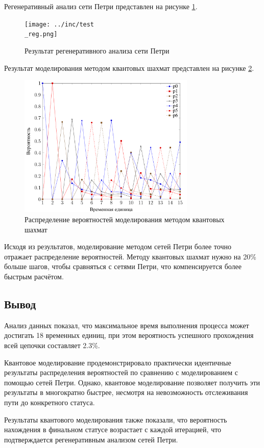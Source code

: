 \clearpage

Регенеративный анализ сети Петри представлен на рисунке \ref{fig:testreg}.

\begin{figure}[h!btp]
	\centering
	\texttt{[image: ../inc/test\\\_reg.png]}
	\caption{Результат регенеративного анализа сети Петри}
	\label{fig:testreg}
\end{figure}

Результат моделирования методом квантовых шахмат представлен на рисунке \ref{fig:testchess}.

\begin{figure}[h!btp]
	\centering
	\includegraphics[width=0.75\textwidth]{../inc/test.png}
	\caption{Распределение вероятностей моделирования методом квантовых шахмат}
	\label{fig:testchess}
\end{figure}

Исходя из результатов, моделирование методом сетей Петри более точно отражает распределение вероятностей. Методу квантовых шахмат нужно на 20\% больше шагов, чтобы сравняться с сетями Петри, что компенсируется более быстрым расчётом.

\subsection{Вывод}

Анализ данных показал, что максимальное время выполнения процесса может достигать 18 временных единиц, при этом вероятность успешного прохождения всей цепочки составляет 2.3\%.

Квантовое моделирование продемонстрировало практически идентичные результаты распределения вероятностей по сравнению с моделированием с помощью сетей Петри. Однако, квантовое моделирование позволяет получить эти результаты в многократно быстрее, несмотря на невозможность отслеживания пути до конкретного статуса.

Результаты квантового моделирования также показали, что вероятность нахождения в финальном статусе возрастает с каждой итерацией, что подтверждается регенеративным анализом сетей Петри.

\clearpage
